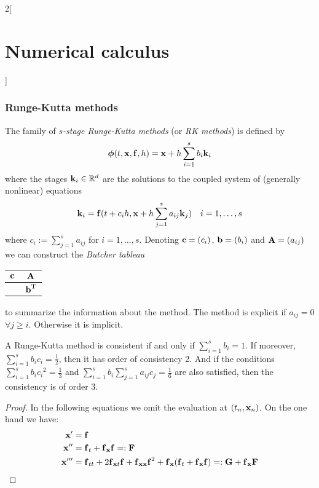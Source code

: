\documentclass[../../../main_math.tex]{subfiles}
\begin{document}
\begin{multicols}{2}[\section{Numerical calculus}]
  \subsubsection{Runge-Kutta methods}
  \begin{definition}
    The family of \emph{$s$-stage Runge-Kutta methods} (or \emph{RK methods}) is defined by $$\boldsymbol{\mathrm{\phi}}(t,\boldsymbol{\mathrm{x}},\boldsymbol{\mathrm{f}},h)=\boldsymbol{\mathrm{x}}+h\sum_{i=1}^sb_i\boldsymbol{\mathrm{k}}_i$$
    where the stages $\boldsymbol{\mathrm{k}}_i\in\mathbb{R}^d$ are the solutions to the coupled system of (generally nonlinear) equations
    $$\boldsymbol{\mathrm{k}}_i=\boldsymbol{\mathrm{f}}(t+c_ih,\boldsymbol{\mathrm{x}}+h\sum_{j=1}^{s}a_{ij}\boldsymbol{\mathrm{k}}_j)\quad i=1,\ldots,s$$
    where $c_i:=\sum_{j=1}^{s}a_{ij}$ for $i=1,\ldots,s$. Denoting $\boldsymbol{\mathrm{c}}=(c_i)$, $\boldsymbol{\mathrm{b}}=(b_i)$ and $\boldsymbol{\mathrm{A}}=(a_{ij})$ we can construct the \emph{Butcher tableau}
    \begin{center}
      \renewcommand{\arraystretch}{1.25}
      \begin{tabular}{c|c}
        $\boldsymbol{\mathrm{c}}$ & $\boldsymbol{\mathrm{A}}$             \\
        \hline
                 & ${\boldsymbol{\mathrm{b}}}^{\mathrm{T}}$
      \end{tabular}
    \end{center}
    to summarize the information about the method. The method is explicit if $a_{ij}=0$ $\forall j\geq i$. Otherwise it is implicit.
  \end{definition}
  \begin{lemma}\label{NC:consistencyRK}
    A Runge-Kutta method is consistent if and only if $\sum_{i=1}^sb_i=1$. If moreover, $\sum_{i=1}^sb_ic_i=\frac{1}{2}$, then it has order of consistency 2. And if the conditions $\sum_{i=1}^sb_i{c_i}^2=\frac{1}{3}$ and $\sum_{i=1}^sb_i\sum_{j=1}^sa_{ij}c_j=\frac{1}{6}$ are also satisfied, then the consistency is of order 3.
  \end{lemma}
  \begin{proof}
    In the following equations we omit the evaluation at $(t_n,\boldsymbol{\mathrm{x}}_n)$.
    On the one hand we have:
    \begin{align*}
      \vf{x}'   & =\vf{f}                                                                                                                                         \\
      \vf{x}''  & =\vf{f}_t+\vf{f}_{\vf{x}}\vf{f}=:\vf{F}                                                                                                         \\
      \vf{x}''' & =\vf{f}_{tt}+2\vf{f}_{\vf{x}t}\vf{f}+{\vf{f}_{\vf{xx}}}\vf{f}^2+\vf{f}_{\vf{x}}(\vf{f}_t+{\vf{f}_{\vf{x}}}\vf{f})=:\vf{G}+\vf{f}_{\vf{x}}\vf{F}

\end{align*}
\end{proof}
\end{multicols}
\end{document}
